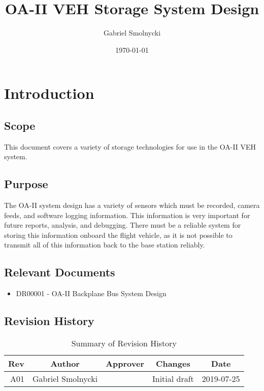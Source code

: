 \documentclass[12pt,article]{memoir}
\title{OA-II VEH Storage System Design}
\author{Gabriel Smolnycki}
\date{\today}
\begin{document}
	


\tableofcontents*
\clearpage


\chapter{Introduction}
\section{Scope}
This document covers a variety of storage technologies for use in the OA-II VEH system.

\section{Purpose}
The OA-II system design has a variety of sensors which must be recorded, camera feeds, and software logging information. This information is very important for future reports, analysis, and debugging. There must be a reliable system for storing this information onboard the flight vehicle, as it is not possible to transmit all of this information back to the base station reliably.

\section{Relevant Documents}
\begin{itemize}
	\item DR00001 - OA-II Backplane Bus System Design
\end{itemize}

\section{Revision History}
\begin{table}[H]
	\centering
	\begin{tabu}{r || c | c | c | c }
		Rev & Author & Approver & Changes & Date\\ \hline
		A01 & Gabriel Smolnycki & & Initial draft & 2019-07-25 \\
	\end{tabu}
	\caption{Summary of Revision History}
	\label{tab:rev}
\end{table}

\newpage
\end{document}
